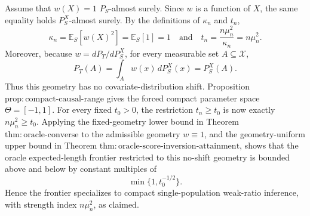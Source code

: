 Assume that \(w(X)=1\) \(P_S\)-almost surely. Since \(w\) is a function of \(X\), the same equality holds \(P_S^X\)-almost surely. By the definitions of \(\kappa_n\) and \(t_n\),
\[
\kappa_n=\mathbb E_S[w(X)^2]=\mathbb E_S[1]=1
\quad\text{and}\quad
 t_n=\frac{n\mu_n^2}{\kappa_n}=n\mu_n^2.
\]
Moreover, because \(w=dP_T/dP_S^X\), for every measurable set \(A\subseteq\mathcal X\),
\[
P_T(A)=\int_A w(x)\,dP_S^X(x)=P_S^X(A).
\]
Thus this geometry has no covariate-distribution shift. Proposition \(\mathrm{prop{:}compact\text{-}causal\text{-}range}\) gives the forced compact parameter space \(\Theta=[-1,1]\). For every fixed \(t_0>0\), the restriction \(t_n\ge t_0\) is now exactly \(n\mu_n^2\ge t_0\). Applying the fixed-geometry lower bound in Theorem \(\mathrm{thm{:}oracle\text{-}converse}\) to the admissible geometry \(w\equiv1\), and the geometry-uniform upper bound in Theorem \(\mathrm{thm{:}oracle\text{-}score\text{-}inversion\text{-}attainment}\), shows that the oracle expected-length frontier restricted to this no-shift geometry is bounded above and below by constant multiples of
\[
\min\{1,t_0^{-1/2}\}.
\]
Hence the frontier specializes to compact single-population weak-ratio inference, with strength index \(n\mu_n^2\), as claimed.